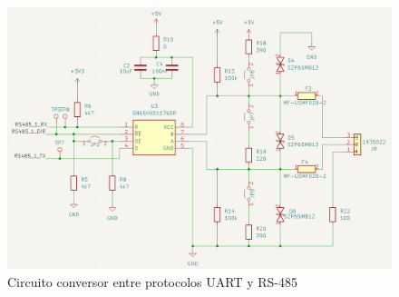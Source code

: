 \begin{figure}[H]
    \centering
    \includegraphics[width =\linewidth]{img/rs485_sch.png}
    \caption{Circuito conversor entre protocolos UART y RS-485}
    \label{fig:rs485_sch}
\end{figure}    
